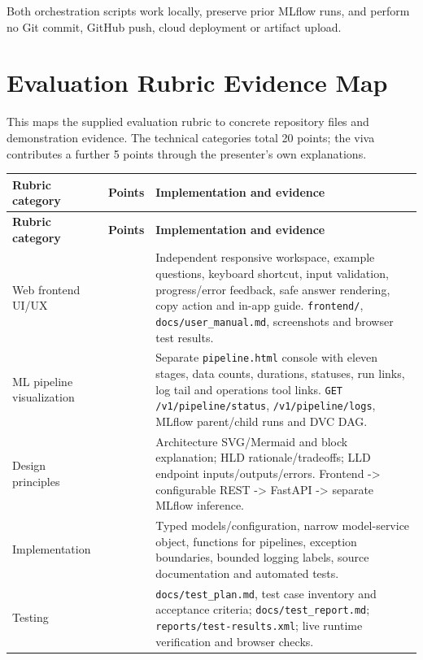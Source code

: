\documentclass[11pt,a4paper]{article}
\begin{document}
Both orchestration scripts work locally, preserve prior MLflow runs, and perform no Git commit, GitHub push, cloud deployment or artifact upload.

\clearpage
\section*{Evaluation Rubric Evidence Map}
This maps the supplied evaluation rubric to concrete repository files and demonstration evidence. The technical categories total 20 points; the viva contributes a further 5 points through the presenter's own explanations.

\begingroup\small
\begin{longtable}{@{}>{\raggedright\arraybackslash}p{0.3333\dimexpr\textwidth-24pt\relax}>{\raggedright\arraybackslash}p{0.3333\dimexpr\textwidth-24pt\relax}>{\raggedright\arraybackslash}p{0.3333\dimexpr\textwidth-24pt\relax}@{}}
\toprule
\textbf{Rubric category} & \textbf{Points} & \textbf{Implementation and evidence} \\
\midrule
\endfirsthead
\textbf{Rubric category} & \textbf{Points} & \textbf{Implementation and evidence} \\
\midrule
\endhead
Web frontend UI/UX & 3 & Independent responsive workspace, example questions, keyboard shortcut, input validation, progress/error feedback, safe answer rendering, copy action and in-app guide. \texttt{frontend/\allowbreak{}}, \texttt{docs/\allowbreak{}user\_\allowbreak{}manual.\allowbreak{}md}, screenshots and browser test results. \\
ML pipeline visualization & 2 & Separate \texttt{pipeline.\allowbreak{}html} console with eleven stages, data counts, durations, statuses, run links, log tail and operations tool links. \texttt{GET /\allowbreak{}v1/\allowbreak{}pipeline/\allowbreak{}status}, \texttt{/\allowbreak{}v1/\allowbreak{}pipeline/\allowbreak{}logs}, MLflow parent/child runs and DVC DAG. \\
Design principles & 2 & Architecture SVG/Mermaid and block explanation; HLD rationale/tradeoffs; LLD endpoint inputs/outputs/errors. Frontend  ->  configurable REST  ->  FastAPI  ->  separate MLflow inference. \\
Implementation & 2 & Typed models/configuration, narrow model-service object, functions for pipelines, exception boundaries, bounded logging labels, source documentation and automated tests. \\
Testing & 1 & \texttt{docs/\allowbreak{}test\_\allowbreak{}plan.\allowbreak{}md}, test case inventory and acceptance criteria; \texttt{docs/\allowbreak{}test\_\allowbreak{}report.\allowbreak{}md}; \texttt{reports/\allowbreak{}test-\allowbreak{}results.\allowbreak{}xml}; live runtime verification and browser checks. \\

\end{longtable}
\end{document}
